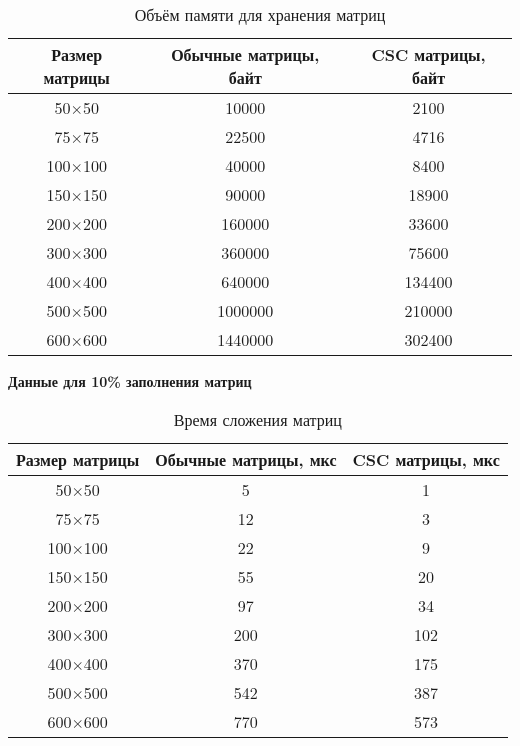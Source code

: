 \begin{table}[H]
	\centering
	\caption{Объём памяти для хранения матриц}
	\begin{tabular}{|c|c|c|}
		\hline
		Размер матрицы & Обычные матрицы, байт & CSC матрицы, байт \\ \hline
		50$\times$50         & 10000                 & 2100             \\ \hline
		75$\times$75         & 22500                 & 4716             \\ \hline
		100$\times$100        & 40000                 & 8400             \\ \hline
		150$\times$150        & 90000                 & 18900            \\ \hline
		200$\times$200        & 160000                & 33600            \\ \hline
		300$\times$300        & 360000                & 75600            \\ \hline
		400$\times$400        & 640000                & 134400           \\ \hline
		500$\times$500        & 1000000               & 210000           \\ \hline
		600$\times$600        & 1440000               & 302400           \\ \hline
	\end{tabular}
\end{table}

\textbf{Данные для 10\% заполнения матриц}
\begin{table}[H]
	\centering
	\caption{Время сложения матриц}
	\begin{tabular}{|c|c|c|}
		\hline
		Размер матрицы & Обычные матрицы, мкс & CSC матрицы, мкс \\ \hline
		50$\times$50         & 5                    & 1                \\ \hline
		75$\times$75         & 12                   & 3                \\ \hline
		100$\times$100        & 22                   & 9                \\ \hline
		150$\times$150        & 55                   & 20               \\ \hline
		200$\times$200        & 97                   & 34               \\ \hline
		300$\times$300        & 200                  & 102              \\ \hline
		400$\times$400        & 370                  & 175              \\ \hline
		500$\times$500        & 542                  & 387              \\ \hline
		600$\times$600        & 770                  & 573              \\ \hline
	\end{tabular}
\end{table}


